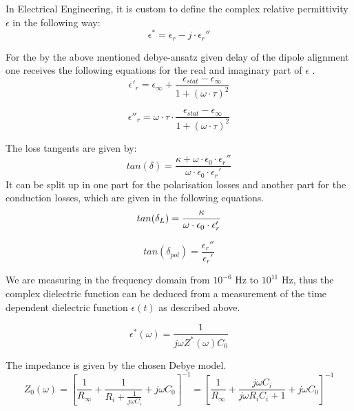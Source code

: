 In Electrical Engineering, it is custom to define the  complex relative permittivity $\epsilon$ in the following way: 
\begin{equation}
\epsilon^* = \epsilon_r-j \cdot \epsilon_r''
\end{equation}

For the by the above mentioned debye-ansatz given delay of the dipole alignment one receives the following equations for the real and imaginary part of $\epsilon$ \cite{Kuchler}. 
\begin{equation}
\epsilon'_r = \epsilon_{\infty} + \frac{\epsilon_{stat}-\epsilon_{\infty}}{1+(\omega \cdot \tau )^2}
\end{equation}

\begin{equation}
\epsilon''_r = \omega \cdot \tau \cdot \frac{\epsilon_{stat}-\epsilon_{\infty}}{1+(\omega \cdot \tau )^2}
\end{equation}

The loss tangents are given by:
\begin{equation}
tan (\delta) = \frac{\kappa + \omega \cdot \epsilon_0 \cdot \epsilon _r ''}{\omega \cdot \epsilon_0 \cdot \epsilon _r '}
\end{equation}
It can be split up in one part for the polarisation losses and another part for the conduction losses, which are given in the following equations. 
\begin{equation}
tan (\delta_{L}) = \frac{\kappa}{\omega \cdot \epsilon_0 \cdot \epsilon_r'} \newline
\end{equation}

\begin{equation}
tan (\delta_{pol}) = \frac {\epsilon_r'' } {\epsilon_r'}
\end{equation}


We are measuring in the frequency domain from $10^{-6}$ Hz to $10^{11}$ Hz, thus the complex dielectric function can be deduced from a measurement of the time dependent dielectric function $\epsilon(t)$ as described above. 

\begin{equation}
\epsilon^*(\omega) = \frac{1}{j \omega  Z^*(\omega) C_0}
\end{equation}

The impedance is given by the chosen Debye model. 
\begin{equation}
Z_0(\omega)=[\frac{1}{R_\infty}+\frac{1}{R_i+\frac{1}{j \omega C_i}}+j \omega C_0]^{-1} = [\frac{1}{R_\infty}+\frac{j \omega C_i}{j\omega R_i  C_i+1}+j \omega C_0]^{-1}
\end{equation}

